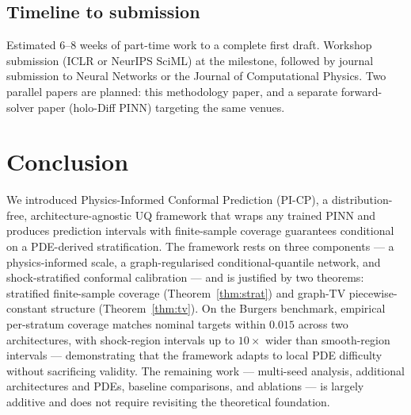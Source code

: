 \documentclass[11pt]{article}
\theoremstyle{definition}
\theoremstyle{remark}
\begin{document}
\subsection{Timeline to submission}

Estimated $6$--$8$ weeks of part-time work to a complete first draft. Workshop submission (ICLR or NeurIPS SciML) at the milestone, followed by journal submission to Neural Networks or the Journal of Computational Physics. Two parallel papers are planned: this methodology paper, and a separate forward-solver paper (holo-Diff PINN) targeting the same venues.

\section{Conclusion}
\label{sec:conclusion}

We introduced Physics-Informed Conformal Prediction (PI-CP), a distribution-free, architecture-agnostic UQ framework that wraps any trained PINN and produces prediction intervals with finite-sample coverage guarantees conditional on a PDE-derived stratification. The framework rests on three components --- a physics-informed scale, a graph-regularised conditional-quantile network, and shock-stratified conformal calibration --- and is justified by two theorems: stratified finite-sample coverage (Theorem~\ref{thm:strat}) and graph-TV piecewise-constant structure (Theorem~\ref{thm:tv}). On the Burgers benchmark, empirical per-stratum coverage matches nominal targets within $0.015$ across two architectures, with shock-region intervals up to $10\times$ wider than smooth-region intervals --- demonstrating that the framework adapts to local PDE difficulty without sacrificing validity. The remaining work --- multi-seed analysis, additional architectures and PDEs, baseline comparisons, and ablations --- is largely additive and does not require revisiting the theoretical foundation.
\end{document}
